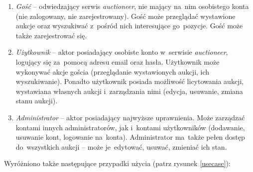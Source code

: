 \begin{enumerate}
  \item \textit{Gość} -- odwiedzający serwis \textit{auctioneer}, nie mający na~nim osobistego konta (nie zalogowany, nie zarejestrowany). Gość może przeglądać wystawione aukcje oraz wyszukiwać z~pośród nich  interesujące go~pozycje. Gość może także zarejestrować się.
  \item \textit{Użytkownik} -- aktor posiadający osobiste konto w~serwisie \textit{auctioneer}, logujący się za~pomocą adresu email oraz hasła. Użytkownik może wykonywać akcje gościa (przeglądanie wystawionych aukcji, ich wyszukiwanie). Ponadto użytkownik posiada możliwość licytowania aukcji, wystawiana własnych aukcji i~zarządzania nimi (edycja, usuwanie, zmiana stanu aukcji).
  \item \textit{Administrator} -- aktor posiadający najwyższe uprawnienia. Może zarządzać kontami innych administratorów, jak i~kontami użytkowników (dodawanie, usuwanie kont, logowanie na~konta). Administrator ma~także pełen dostęp do~wszystkich aukcji -- może je~edytować, usuwać, zmieniać ich stan.
\end{enumerate}

Wyróżniono także następujące przypadki użycia (patrz rysunek \ref{usecase}):

